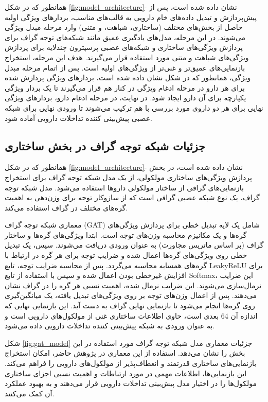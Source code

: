 همانطور که در شکل \ref{fig:model_architecture}- نشان داده شده است، پس از پیش‌پردازش و تبدیل داده‌های خام دارویی به قالب‌های مناسب، بردارهای ویژگی اولیه حاصل از بخش‌های مختلف (ساختاری، شباهت، و متنی) وارد مرحله مبدل ویژگی می‌شوند. در این مرحله، مدل‌های یادگیری عمیق مانند شبکه‌های توجه گراف برای پردازش ویژگی‌های ساختاری و شبکه‌های عصبی پرسپترون چندلایه برای پردازش ویژگی‌های شباهت و متنی مورد استفاده قرار می‌گیرند. هدف این مرحله، استخراج بازنمایی‌های عمیق‌تر و غنی‌تر از ویژگی‌های اولیه است. پس از اتمام مرحله مبدل ویژگی، همانطور که در شکل نشان داده شده است، بردارهای ویژگی پردازش شده برای هر دارو در مرحله ادغام ویژگی در کنار هم قرار می‌گیرند تا یک بردار ویژگی یکپارچه برای آن دارو ایجاد شود. در نهایت، در مرحله ادغام دارو، بردارهای ویژگی نهایی برای هر دو داروی مورد بررسی با هم ترکیب می‌شوند تا ورودی نهایی برای شبکه عصبی پیش‌بینی کننده تداخلات دارویی آماده شود.


\subsection{جزئیات شبکه توجه گراف در بخش ساختاری}

همانطور که در شکل \ref{fig:model_architecture}- نشان داده شده است، در بخش پردازش ویژگی‌های ساختاری مولکولی، از یک مدل شبکه توجه گراف برای استخراج بازنمایی‌های گرافی از ساختار مولکولی داروها استفاده می‌شود. مدل شبکه توجه گراف، یک نوع شبکه عصبی گرافی است که از سازوکار توجه برای وزن‌دهی به اهمیت گره‌های مختلف در گراف استفاده می‌کند.

معماری شبکه توجه گراف (GAT) شامل یک لایه تبدیل خطی برای پردازش ویژگی‌های گره‌ها و یک مکانیزم محاسبه وزن‌های توجه است. ابتدا ویژگی‌های گره‌ها و ساختار گراف (بر اساس ماتریس مجاورت) به عنوان ورودی دریافت می‌شوند. سپس، یک تبدیل خطی روی ویژگی‌های گره‌ها اعمال شده و ضرایب توجه برای هر گره در ارتباط با گره‌های همسایه محاسبه می‌گردد. پس از محاسبه ضرایب توجه، تابع LeakyReLU برای افزایش غیرخطی بودن اعمال شده و سپس با استفاده از تابع Softmax، این ضرایب نرمال‌سازی می‌شوند. این ضرایب نرمال شده، اهمیت نسبی هر گره را در گراف نشان می‌دهند. پس از اعمال وزن‌های توجه بر روی ویژگی‌های تبدیل یافته، یک میانگین‌گیری روی گره‌ها انجام می‌شود تا بازنمایی نهایی گراف به دست آید. این بازنمایی نهایی که اندازه آن 64 بعدی است، حاوی اطلاعات ساختاری غنی از مولکول‌های دارویی است و به عنوان ورودی به شبکه پیش‌بینی کننده تداخلات دارویی داده می‌شود.

شکل \ref{fig:gat_model} جزئیات معماری مدل شبکه توجه گراف مورد استفاده در این بخش را نشان می‌دهد. استفاده از این معماری در پژوهش حاضر، امکان استخراج بازنمایی‌های ساختاری قدرتمند و انعطاف‌پذیر از مولکول‌های دارویی را فراهم می‌کند. این بازنمایی‌ها، اطلاعات مهمی در مورد ارتباطات و اهمیت نسبی اجزای ساختاری مولکول‌ها را در اختیار مدل پیش‌بینی تداخلات دارویی قرار می‌دهند و به بهبود عملکرد آن کمک می‌کنند.

